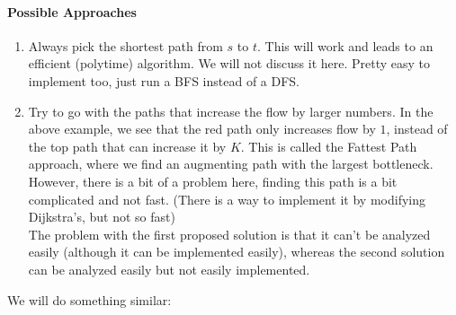 \documentclass[12 pt]{article}
\begin{document}
        \paragraph{Possible Approaches}
        \begin{enumerate}
        \item Always pick the shortest path from $s$ to $t$. This will
          work and leads to an efficient (polytime) algorithm. We will
          not discuss it here. Pretty easy to implement too, just run
          a BFS instead of a DFS.
        \item Try to go with the paths that increase the flow by
          larger numbers. In the above example, we see that the red
          path only increases flow by $1$, instead of the top path
          that can increase it by $K$. This is called the Fattest Path
          approach, where we find an augmenting path with the largest
          bottleneck. However, there is a bit of a problem here,
          finding this path is a bit complicated and not fast. (There
          is a way to implement it by modifying Dijkstra's, but not so
          fast)
          \\ The problem with the first proposed solution is that it
          can't be analyzed easily (although it can be implemented
          easily), whereas the second solution can be analyzed easily
          but not easily implemented.
        \end{enumerate}
        We will do something similar:
\end{document}
